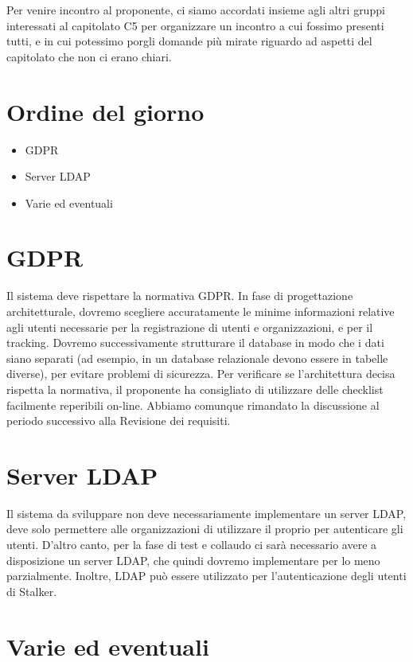 \documentclass{article}
\begin{document}
Per venire incontro al proponente, ci siamo accordati insieme agli altri gruppi interessati al capitolato C5 per organizzare un incontro a cui fossimo presenti tutti, e in cui potessimo porgli domande più mirate riguardo ad aspetti del capitolato che non ci erano chiari.

\section{Ordine del giorno}%
\label{sec:ordine_del_giorno}

\begin{itemize}
  \item GDPR
  \item Server LDAP
  \item Varie ed eventuali
\end{itemize}
\section{GDPR}%
\label{sec:gdpr}
Il sistema deve rispettare la normativa GDPR\@.
In fase di progettazione architetturale, dovremo scegliere accuratamente le minime informazioni relative agli utenti necessarie per la registrazione di utenti e organizzazioni, e per il tracking.
Dovremo successivamente strutturare il database in modo che i dati siano separati (ad esempio, in un database relazionale devono essere in tabelle diverse), per evitare problemi di sicurezza.
Per verificare se l'architettura decisa rispetta la normativa, il proponente ha consigliato di utilizzare delle checklist facilmente reperibili on-line.
Abbiamo comunque rimandato la discussione al periodo successivo alla Revisione dei requisiti.
\section{Server LDAP}%
\label{sec:server_ldap}
Il sistema da sviluppare non deve necessariamente implementare un server LDAP, deve solo permettere alle organizzazioni di utilizzare il proprio per autenticare gli utenti.
D'altro canto, per la fase di test e collaudo ci sarà necessario avere a disposizione un server LDAP, che quindi dovremo implementare per lo meno parzialmente.
Inoltre, LDAP può essere utilizzato per l'autenticazione degli utenti di Stalker.
\section{Varie ed eventuali}%
\label{sec:varie_ed_eventuali}
\end{document}

